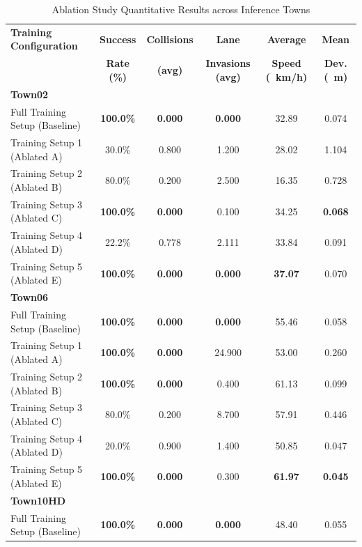 \documentclass[sn-mathphys,Numbered]{sn-jnl}
\begin{document}
\begin{table}[htbp]
\centering
\caption{Ablation Study Quantitative Results across Inference Towns}
\label{tab:ablation_benchmark_results}
\footnotesize
\setlength{\tabcolsep}{4.5pt}
\begin{tabular}{lccccc}
\hline
\textbf{Training Configuration} & \textbf{Success} & \textbf{Collisions} & \textbf{Lane} & \textbf{Average} & \textbf{Mean} \\
 & \textbf{Rate (\%)} & \textbf{(avg)} & \textbf{Invasions (avg)} & \textbf{Speed (\SI{}{km/h})} & \textbf{Dev. (\SI{}{\meter})} \\
\hline
\textbf{Town02} & & & & & \\
\quad Full Training Setup (Baseline) & \textbf{100.0\%} & \textbf{0.000} & \textbf{0.000} & 32.89 & 0.074 \\
\quad Training Setup 1 (Ablated A) & 30.0\% & 0.800 & 1.200 & 28.02 & 1.104 \\
\quad Training Setup 2 (Ablated B) & 80.0\% & 0.200 & 2.500 & 16.35 & 0.728 \\
\quad Training Setup 3 (Ablated C) & \textbf{100.0\%} & \textbf{0.000} & 0.100 & 34.25 & \textbf{0.068} \\
\quad Training Setup 4 (Ablated D) & 22.2\% & 0.778 & 2.111 & 33.84 & 0.091 \\
\quad Training Setup 5 (Ablated E) & \textbf{100.0\%} & \textbf{0.000} & \textbf{0.000} & \textbf{37.07} & 0.070 \\
\hline
\textbf{Town06} & & & & & \\
\quad Full Training Setup (Baseline) & \textbf{100.0\%} & \textbf{0.000} & \textbf{0.000} & 55.46 & 0.058 \\
\quad Training Setup 1 (Ablated A) & \textbf{100.0\%} & \textbf{0.000} & 24.900 & 53.00 & 0.260 \\
\quad Training Setup 2 (Ablated B) & \textbf{100.0\%} & \textbf{0.000} & 0.400 & 61.13 & 0.099 \\
\quad Training Setup 3 (Ablated C) & 80.0\% & 0.200 & 8.700 & 57.91 & 0.446 \\
\quad Training Setup 4 (Ablated D) & 20.0\% & 0.900 & 1.400 & 50.85 & 0.047 \\
\quad Training Setup 5 (Ablated E) & \textbf{100.0\%} & \textbf{0.000} & 0.300 & \textbf{61.97} & \textbf{0.045} \\
\hline
\textbf{Town10HD} & & & & & \\
\quad Full Training Setup (Baseline) & \textbf{100.0\%} & \textbf{0.000} & \textbf{0.000} & 48.40 & 0.055 \\

\end{tabular}
\end{table}
\end{document}
